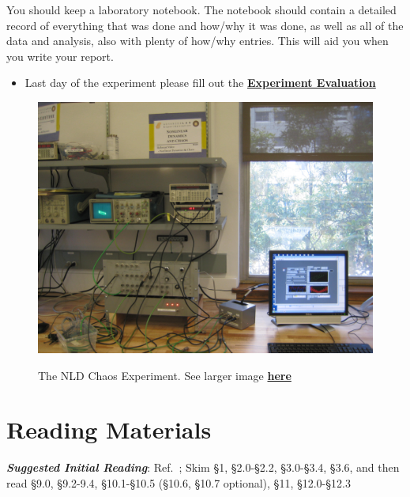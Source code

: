 \documentclass{../lab}
\begin{document}
You should keep a laboratory notebook. The notebook should contain a detailed record of everything that was done and how/why it was done, as well as all of the data and analysis, also with plenty of how/why entries. This will aid you when you write your report.

\begin{itemize}
    \item Last day of the experiment please fill out the \href{\ExperimentEvaluation}{\textbf{Experiment Evaluation}}
\end{itemize}

\begin{figure}[h]
    \centering
    \href{http://experimentationlab.berkeley.edu/sites/default/files/images/NLD_3516.jpg}{\includegraphics[width=0.7\linewidth]{images/NLD_3516.jpg}}
    \caption{The NLD Chaos Experiment. See larger image \href{http://experimentationlab.berkeley.edu/sites/default/files/images/NLD_3516.jpg}{\textbf{here}}}
\end{figure}

\section{Reading Materials}

\emph{\textbf{Suggested Initial Reading}}: Ref.~\cite{Strogatz}; Skim \S1, \S2.0-\S2.2, \S3.0-\S3.4, \S3.6, and then read \S9.0, \S9.2-9.4, \S10.1-\S10.5 (\S10.6, \S10.7 optional), \S11, \S12.0-\S12.3
\end{document}
